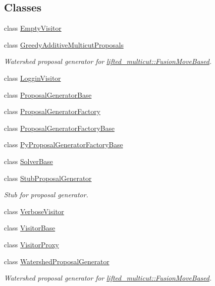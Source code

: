 \subsection*{Classes}
\begin{DoxyCompactItemize}
\item 
class \hyperlink{classnifty_1_1graph_1_1optimization_1_1common_1_1EmptyVisitor}{Empty\+Visitor}
\item 
class \hyperlink{classnifty_1_1graph_1_1optimization_1_1common_1_1GreedyAdditiveMulticutProposals}{Greedy\+Additive\+Multicut\+Proposals}
\begin{DoxyCompactList}\small\item\em Watershed proposal generator for \hyperlink{classnifty_1_1graph_1_1lifted__multicut_1_1FusionMoveBased}{lifted\+\_\+multicut\+::\+Fusion\+Move\+Based}. \end{DoxyCompactList}\item 
class \hyperlink{classnifty_1_1graph_1_1optimization_1_1common_1_1LogginVisitor}{Loggin\+Visitor}
\item 
class \hyperlink{classnifty_1_1graph_1_1optimization_1_1common_1_1ProposalGeneratorBase}{Proposal\+Generator\+Base}
\item 
class \hyperlink{classnifty_1_1graph_1_1optimization_1_1common_1_1ProposalGeneratorFactory}{Proposal\+Generator\+Factory}
\item 
class \hyperlink{classnifty_1_1graph_1_1optimization_1_1common_1_1ProposalGeneratorFactoryBase}{Proposal\+Generator\+Factory\+Base}
\item 
class \hyperlink{classnifty_1_1graph_1_1optimization_1_1common_1_1PyProposalGeneratorFactoryBase}{Py\+Proposal\+Generator\+Factory\+Base}
\item 
class \hyperlink{classnifty_1_1graph_1_1optimization_1_1common_1_1SolverBase}{Solver\+Base}
\item 
class \hyperlink{classnifty_1_1graph_1_1optimization_1_1common_1_1StubProposalGenerator}{Stub\+Proposal\+Generator}
\begin{DoxyCompactList}\small\item\em Stub for proposal generator. \end{DoxyCompactList}\item 
class \hyperlink{classnifty_1_1graph_1_1optimization_1_1common_1_1VerboseVisitor}{Verbose\+Visitor}
\item 
class \hyperlink{classnifty_1_1graph_1_1optimization_1_1common_1_1VisitorBase}{Visitor\+Base}
\item 
class \hyperlink{classnifty_1_1graph_1_1optimization_1_1common_1_1VisitorProxy}{Visitor\+Proxy}
\item 
class \hyperlink{classnifty_1_1graph_1_1optimization_1_1common_1_1WatershedProposalGenerator}{Watershed\+Proposal\+Generator}
\begin{DoxyCompactList}\small\item\em Watershed proposal generator for \hyperlink{classnifty_1_1graph_1_1lifted__multicut_1_1FusionMoveBased}{lifted\+\_\+multicut\+::\+Fusion\+Move\+Based}. \end{DoxyCompactList}\end{DoxyCompactItemize}
